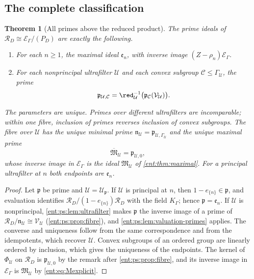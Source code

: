 \documentclass[11pt]{article}
\newtheorem{theorem}{Theorem}[section]
\theoremstyle{plain}
\theoremstyle{plain}
\theoremstyle{plain}
\theoremstyle{definition}
\theoremstyle{definition}
\theoremstyle{definition}
\theoremstyle{definition}
\theoremstyle{remark}
\newcommand{\RD}{\mathcal R_D}\newcommand{\Ucal}{\mathcal U}
\begin{document}
\subsection{The complete classification}
\label{ent:ps:subsec:classification}

\begin{theorem}[All primes above the reduced product]
\label{ent:ps:thm:spectrum}
The prime ideals of $\RD\cong\mathcal E_\Gamma/(P_D)$ are exactly the
following.
\begin{enumerate}[label=\textnormal{(\alph*)},leftmargin=2em]
\item For each $n\ge1$, the maximal ideal $\mathfrak e_n$, with inverse image
$(Z-\rho_n)\mathcal E_\Gamma$.
\item For each nonprincipal ultrafilter $\Ucal$ and each convex subgroup
$\mathcal C\le\Gamma_\Ucal$, the prime
\begin{equation}\label{ent:ps:eq:pUC}
 \mathfrak p_{\Ucal,\mathcal C}
 =\red_\Ucal^{-1}\bigl(\mathfrak p_{\mathcal C}(\mathcal V_\Ucal)\bigr).
\end{equation}
\end{enumerate}
The parameters are unique. Primes over different ultrafilters are
incomparable; within one fibre, inclusion of primes reverses inclusion of
convex subgroups. The fibre over $\Ucal$ has the unique minimal prime
$\mathfrak n_\Ucal=\mathfrak p_{\Ucal,\Gamma_\Ucal}$ and the unique maximal
prime
\[
 \overline{\mathfrak M}_\Ucal=\mathfrak p_{\Ucal,0},
\]
whose inverse image in $\mathcal E_\Gamma$ is the ideal $\mathfrak M_\Ucal$
of \cref{ent:thm:maximal}. For a principal ultrafilter at $n$ both endpoints
are $\mathfrak e_n$.
\end{theorem}
\begin{proof}
Let $\mathfrak p$ be prime and $\Ucal=\Ucal_{\mathfrak p}$. If $\Ucal$ is
principal at $n$, then $1-e_{\{n\}}\in\mathfrak p$, and evaluation
identifies $\RD/(1-e_{\{n\}})\RD$ with the field $K_\Gamma$; hence
$\mathfrak p=\mathfrak e_n$. If $\Ucal$ is nonprincipal,
\cref{ent:ps:lem:ultrafilter} makes $\mathfrak p$ the inverse image of a prime
of $\RD/\mathfrak n_\Ucal\cong\mathcal V_\Ucal$
(\cref{ent:ps:prop:fibre}), and \cref{ent:ps:lem:valuation-primes} applies.
The converse and uniqueness follow from the same correspondence and from the
idempotents, which recover $\Ucal$. Convex subgroups of an ordered group are
linearly ordered by inclusion, which gives the uniqueness of the endpoints.
The kernel of $\Phi_\Ucal$ on $\RD$ is $\mathfrak p_{\Ucal,0}$ by the
remark after \cref{ent:ps:prop:fibre}, and its inverse image in
$\mathcal E_\Gamma$ is $\mathfrak M_\Ucal$ by \eqref{ent:eq:Mexplicit}.
\end{proof}
\end{document}
